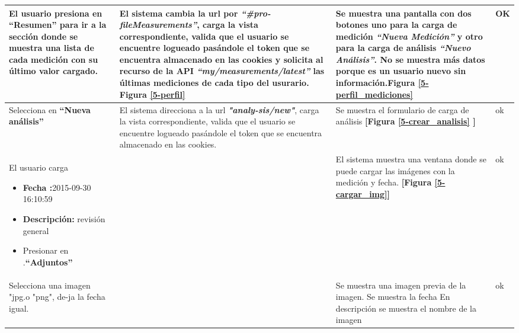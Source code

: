 \begin{longtable}{|p{4cm}|p{4cm}|p{4cm}|p{3cm}|}
El usuario presiona en \textbf{``Resumen'' } para ir a la sección donde se muestra una lista de cada medición con su último valor cargado.

& El sistema cambia la url por \textit{\textbf{``\#pro-fileMeasurements''}}, carga la vista correspondiente, valida que el usuario se encuentre logueado pasándole el token que se encuentra almacenado en las cookies y solicita al recurso de la API \textit{\textbf{``my/measurements/latest'' }}las últimas mediciones de cada tipo del usurario. \textbf{Figura \ref{5-perfil}}

& Se muestra una pantalla con dos botones uno para la carga de medición
\textit{\textbf{``Nueva Medición'' }}y otro para la carga de análisis \textit{\textbf{``Nuevo Análisis''}}. No se muestra más datos porque es un usuario nuevo sin información.\textbf{Figura \ref{5-perfil_mediciones}}
& OK
\\ \hline



Selecciona en \textbf{``Nueva análisis'' }
& El sistema direcciona a la url \textit{\textbf{"analy-sis/new"}}, carga la vista correspondiente, valida que el usuario se encuentre logueado pasándole el token que se encuentra almacenado en las cookies.

& Se muestra el formulario de carga de análisis \textbf{[Figura \ref{5-crear_analisis} ]}
& ok
\\ \hline



El usuario carga

\begin{itemize}
	\item \textbf{Fecha :}2015-09-30 16:10:59
	\item \textbf{Descripción: }revisión general
	\item Presionar en .\textbf{``Adjuntos''}

\end{itemize}

&
& El sistema muestra una ventana donde se puede cargar las imágenes con la medición y fecha.\textbf{ [Figura  \ref{5-cargar_img}]}
&ok

\\ \hline



Selecciona una imagen "jpg.o "png", de-ja la fecha igual. 
&
& Se muestra una imagen previa de la imagen. Se muestra la fecha En descripción se muestra el nombre de la imagen
& ok
\\ \hline
 

\end{longtable}
